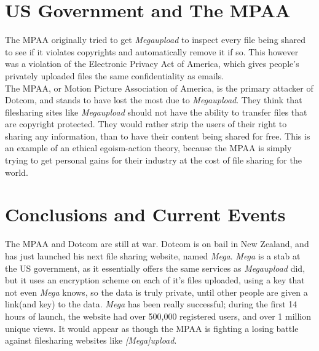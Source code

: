\documentclass[paper=a4, fontsize=11pt]{scrartcl} %
\numberwithin{equation}{section} %
\numberwithin{figure}{section} %
\numberwithin{table}{section} %
\begin{document}
 \section{US Government and The MPAA}
The MPAA originally tried to get \emph{Megaupload} to inspect every file being shared to see if it violates copyrights and automatically remove it if so.  This however was a violation of the Electronic Privacy Act of America, which gives people's privately uploaded files the same confidentiality as emails. \\

The MPAA, or Motion Picture Association of America, is the primary attacker of Dotcom, and stands to have lost the most due to \emph{Megaupload}.  They think that filesharing sites like \emph{Megaupload} should not have the ability to transfer files that are copyright protected.  They would rather strip the users of their right to sharing any information, than to have their content being shared for free.  This is an example of an ethical egoism-action theory, because the MPAA is simply trying to get personal gains for their industry at the cost of file sharing for the world.

\section{Conclusions and Current Events}
The MPAA and Dotcom are still at war.  Dotcom is on bail in New Zealand, and has just launched his next file sharing website, named \emph{Mega}.  \emph{Mega} is a stab at the US government, as it essentially offers the same services as \emph{Megaupload} did, but it uses an encryption scheme on each of it's files uploaded, using a key that not even \emph{Mega} knows, so the data is truly private, until other people are given a link(and key) to the data.  \emph{Mega} has been really successful; during the first 14 hours of launch, the website had over 500,000 registered users, and over 1 million unique views.\cite{44}  It would appear as though the MPAA is fighting a losing battle against filesharing websites like \emph{[Mega]upload}.

 

\end{document}
